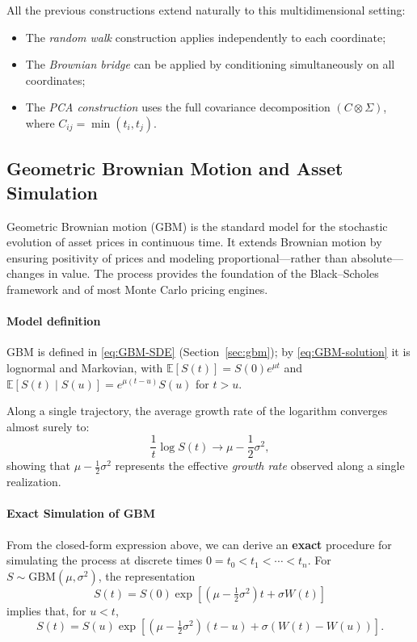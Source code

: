 All the previous constructions extend naturally to this multidimensional setting:
\begin{itemize}
    \item The \emph{random walk} construction applies independently to each coordinate;
    \item The \emph{Brownian bridge} can be applied by conditioning simultaneously on all coordinates;
    \item The \emph{PCA construction} uses the full covariance decomposition $(C \otimes \Sigma)$, where $C_{ij} = \min(t_i,t_j)$.
\end{itemize}

\subsection{Geometric Brownian Motion and Asset Simulation}\label{sec:mc-gbm}

Geometric Brownian motion (GBM) is the standard model for the stochastic evolution of asset prices in continuous time.  
It extends Brownian motion by ensuring positivity of prices and modeling proportional---rather than absolute---changes in value.  
The process provides the foundation of the Black--Scholes framework and of most Monte Carlo pricing engines.
\paragraph{Model definition}

GBM is defined in \eqref{eq:GBM-SDE} (Section~\ref{sec:gbm}); by \eqref{eq:GBM-solution} it is lognormal and Markovian, with $\mathbb E[S(t)]=S(0)e^{\mu t}$ and $\mathbb{E}[S(t)\mid S(u)] = e^{\mu (t-u)}S(u)$ for $t>u$.

Along a single trajectory, the average growth rate of the logarithm converges almost surely to:
\[
\frac{1}{t}\log S(t) \to \mu - \frac{1}{2}\sigma^2,
\]
showing that $\mu - \tfrac{1}{2}\sigma^2$ represents the effective \emph{growth rate} observed along a single realization.
\paragraph{Exact Simulation of GBM}

From the closed-form expression above, we can derive an \textbf{exact} procedure for simulating the process at discrete times $0 = t_0 < t_1 < \cdots < t_n$.  
For $S \sim \mathrm{GBM}(\mu,\sigma^2)$, the representation
\[
S(t) = S(0)\exp\!\left[\left(\mu - \tfrac{1}{2}\sigma^2\right)t + \sigma W(t)\right]
\]
implies that, for $u < t$,
\[
S(t) = S(u)\exp\!\left[\left(\mu - \tfrac{1}{2}\sigma^2\right)(t-u) + \sigma(W(t)-W(u))\right].
\]

